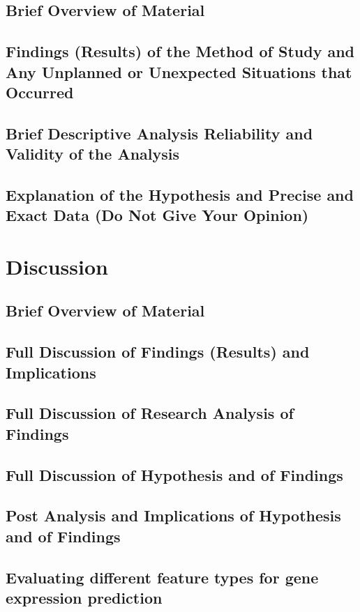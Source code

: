 \documentclass[]{article}
\begin{document}
\subsection*{Brief Overview of Material}
\subsection*{Findings (Results) of the Method of Study and Any Unplanned or Unexpected Situations that Occurred}
\subsection*{Brief Descriptive Analysis
Reliability and Validity of the Analysis}
\subsection*{Explanation of the Hypothesis and Precise and Exact Data (Do Not Give Your Opinion)}


\newpage
\section{Discussion}
\label{sec:discussion}
\subsection*{Brief Overview of Material}
\subsection*{Full Discussion of Findings (Results) and Implications}
\subsection*{Full Discussion of Research Analysis of Findings}
\subsection*{Full Discussion of Hypothesis and of Findings}
\subsection*{Post Analysis and Implications of Hypothesis and of Findings}

\subsection{Evaluating different feature types for gene expression prediction}
\end{document}
